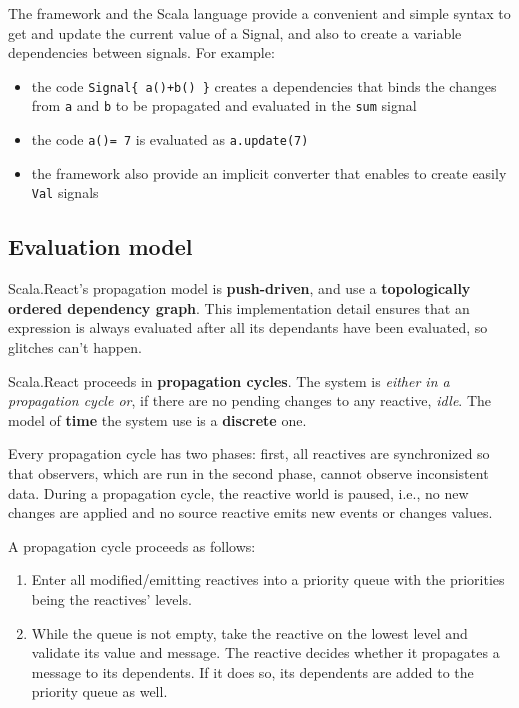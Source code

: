 The framework and the Scala language provide a convenient and simple
syntax to get and update the current value of a Signal, and also to
create a variable dependencies between signals. For example:

\begin{itemize}
\itemsep1pt\parskip0pt
\item
  the code \texttt{Signal\{\ a()+b()\ \}} creates a dependencies that
  binds the changes from \texttt{a} and \texttt{b} to be propagated and
  evaluated in the \texttt{sum} signal
\item
  the code \texttt{a()=\ 7} is evaluated as \texttt{a.update(7)}
\item
  the framework also provide an implicit converter that enables to
  create easily \texttt{Val} signals
\end{itemize}


\subsection{Evaluation model}\label{evaluation-model}

Scala.React's propagation model is \textbf{push-driven}, and use a
\textbf{topologically ordered dependency graph}. This implementation
detail ensures that an expression is always evaluated after all its
dependants have been evaluated, so glitches can't happen.

Scala.React proceeds in \textbf{propagation cycles}. The system is
\emph{either in a propagation cycle or}, if there are no pending changes
to any reactive, \emph{idle}. The model of \textbf{time} the system use
is a \textbf{discrete} one.

Every propagation cycle has two phases: first, all reactives are
synchronized so that observers, which are run in the second phase,
cannot observe inconsistent data. During a propagation cycle, the
reactive world is paused, i.e., no new changes are applied and no source
reactive emits new events or changes values.

A propagation cycle proceeds as follows:

\begin{enumerate}
\def\labelenumi{\arabic{enumi}.}
\itemsep1pt\parskip0pt
\item
  Enter all modified/emitting reactives into a priority queue with the
  priorities being the reactives' levels.
\item
  While the queue is not empty, take the reactive on the lowest level
  and validate its value and message. The reactive decides whether it
  propagates a message to its dependents. If it does so, its dependents
  are added to the priority queue as well.
\end{enumerate}

